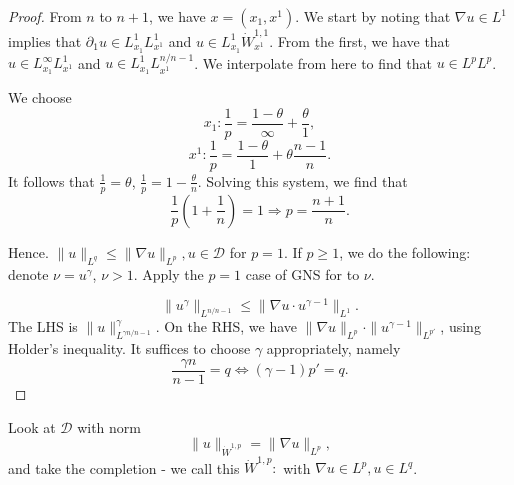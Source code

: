 \documentclass[11pt]{scrartcl}
\begin{document}
\begin{proof}
From $n$ to $n+1$, we have $x = (x_1, x^1)$.  We start by noting that $\nabla u \in L^1$ implies that $\partial_1 u \in L_{x_1}^1 L_{x^1}^1$ and $u \in L_{x_1}^1 \dot{W}_{x^1}^{1, 1}.$  From the first, we have that $u \in L_{x_1}^{\infty} L_{x^1}^1$ and $u \in L_{x_1}^1 L_{x^1}^{n/n-1}$.  We interpolate from here to find that $u \in L^p L^p$.  

We choose 
$$x_1: \frac{1}{p} = \frac{1 - \theta}{\infty} + \frac{\theta}{1},$$
$$x^1: \frac{1}{p} = \frac{1 - \theta}{1} + \theta \frac{n-1}{n}.$$
It follows that $\frac{1}{p} = \theta$, $\frac{1}{p} = 1 - \frac{\theta}{n}$.  Solving this system, we find that 
$$\frac{1}{p}\left (1 + \frac{1}{n}\right) = 1 \Longrightarrow p = \frac{n+1}{n}. $$

Hence. $\|u\|_{L^q} \le \|\nabla u \|_{L^p}, u \in \mathcal D$ for $p = 1$.  If $p \ge 1$, we do the following: denote $\nu = u^{\gamma}$, $\nu > 1$.  Apply the $p=1$ case of GNS for to $\nu$.

$$\|u^{\gamma} \|_{L^{n/n-1}} \le \|\nabla u \cdot u^{\gamma - 1} \|_{L^1}.$$
The LHS is $\|u\|_{L^{\gamma n/n-1}}^{\gamma}$.  On the RHS, we have $\|\nabla u\|_{L^p} \cdot \|u^{\gamma-1}\|_{L^{p'}}$, using Holder's inequality. 
 It suffices to choose $\gamma$ appropriately, namely
$$\frac{\gamma n}{n-1} = q \Leftrightarrow (\gamma - 1) p' = q.$$
\end{proof}


Look at $\mathcal D$ with norm
$$\|u\|_{\dot{W}^{1, p}} = \| \nabla u \|_{L^p},$$
and take the completion - we call this $\dot{W}^{1,p}:$ with $\nabla u \in L^p, u \in L^q$. 
\end{document}
